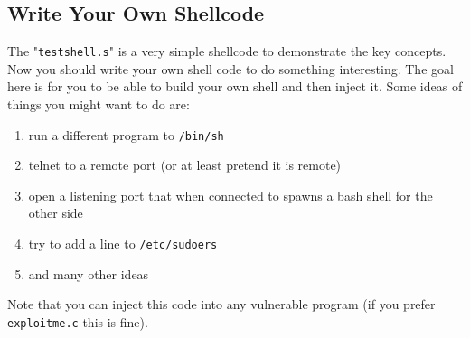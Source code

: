 \documentclass{article}
\begin{document}
\subsection{Write Your Own Shellcode}
The "\lstinline{testshell.s}" is a very simple shellcode to demonstrate the key concepts.
Now you should write your own shell code to do something interesting. The
goal here is for you to be able to build your own shell and then inject it.
Some ideas of things you might want to do are:
\begin{enumerate}
    \item run a different program to \lstinline{/bin/sh}
    \item telnet to a remote port (or at least pretend it is remote)
    \item open a listening port that when connected to spawns a bash shell for the other side
    \item try to add a line to \lstinline{/etc/sudoers}
    \item and many other ideas
\end{enumerate}
\noindent Note that you can inject this code into any vulnerable program (if you
prefer \lstinline{exploitme.c} this is fine).
% 
% 
\end{document}
